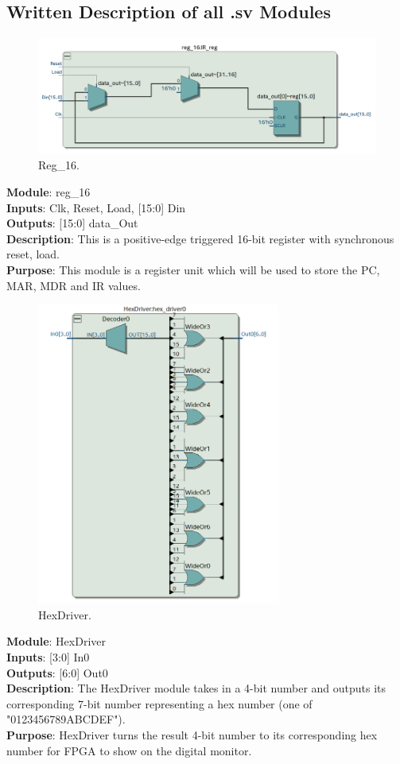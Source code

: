 \documentclass[12pt]{article}
\begin{document}
\subsection{Written Description of all .sv Modules}
\begin{figure}[H]
    \centering
    \includegraphics[width=15cm]{reg16.png}
    \caption{Reg\_16.}
\end{figure}
\textbf{Module}: reg\_16 \\ 
\textbf{Inputs}: Clk, Reset, Load, [15:0] Din \\ 
\textbf{Outputs}: [15:0] data\_Out \\ 
\textbf{Description}: This is a positive-edge triggered 16-bit register with synchronous reset, load. \\ 
\textbf{Purpose}: This module is a register unit which will be used to store the PC, MAR, MDR and IR values. \\

\begin{figure}[H]
    \centering
    \includegraphics[width=8cm]{hexdriver.png}
    \caption{HexDriver.}
\end{figure}
\textbf{Module}: HexDriver \\ 
\textbf{Inputs}: [3:0] In0\\ 
\textbf{Outputs}: [6:0] Out0\\ 
\textbf{Description}: The HexDriver module takes in a 4-bit number and outputs its corresponding 7-bit number representing a hex number (one of "0123456789ABCDEF"). \\ 
\textbf{Purpose}: HexDriver turns the result 4-bit number to its corresponding hex number for FPGA to show on the digital monitor. \\
\end{document}
